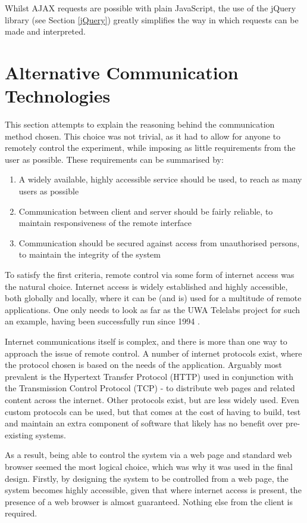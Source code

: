 Whilst AJAX requests are possible with plain JavaScript, the use of the jQuery library (see Section \ref{jQuery}) greatly simplifies the way in which requests can be made and interpreted.

\section{Alternative Communication Technologies}\label{Alternative Communication}

This section attempts to explain the reasoning behind the communication method chosen. This choice was not trivial, as it had to allow for anyone to remotely control the experiment, while imposing as little requirements from the user as possible. These requirements can be summarised by:
\begin{enumerate}
	\item A widely available, highly accessible service should be used, to reach as many users as possible
	\item Communication between client and server should be fairly reliable, to maintain responsiveness of the remote interface
	\item Communication should be secured against access from unauthorised persons, to maintain the integrity of the system
\end{enumerate}

To satisfy the first criteria, remote control via some form of internet access was the natural choice. Internet access is widely established and highly accessible, both globally and locally, where it can be (and is) used for a multitude of remote applications. One only needs to look as far as the UWA Telelabs project for such an example, having been successfully run since 1994 \cite{telelabs}.

Internet communications itself is complex, and there is more than one way to approach the issue of remote control. A number of internet protocols exist, where the protocol chosen is based on the needs of the application. Arguably most prevalent is the Hypertext Transfer Protocol (HTTP)\cite{rfc2616} used in conjunction with the Transmission Control Protocol (TCP) - to distribute web pages and related content across the internet. Other protocols exist, but are less widely used. Even custom protocols can be used, but that comes at the cost of having to build, test and maintain an extra component of software that likely has no benefit over pre-existing systems.

As a result, being able to control the system via a web page and standard web browser seemed the most logical choice, which was why it was used in the final design. Firstly, by designing the system to be controlled from a web page, the system becomes highly accessible, given that where internet access is present, the presence of a web browser is almost guaranteed. Nothing else from the client is required. 

